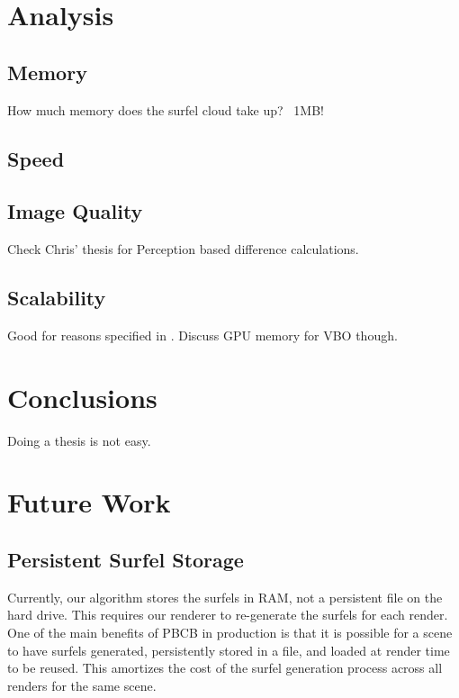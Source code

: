 \section{Analysis}

\subsection{Memory}
How much memory does the surfel cloud take up? ~1MB!

\subsection{Speed}

\subsection{Image Quality}
Check Chris' thesis for Perception based difference calculations.

\subsection{Scalability}
Good for reasons specified in \cite{bib:christensen2008}. Discuss GPU memory for VBO though.

\section{Conclusions}
Doing a thesis is not easy.

\section{Future Work}

\subsection{Persistent Surfel Storage}
Currently, our algorithm stores the surfels in RAM, not a persistent file on the hard drive. This requires our renderer to re-generate the surfels for each render. One of the main benefits of PBCB in production is that it is possible for a scene to have surfels generated, persistently stored in a file, and loaded at render time to be reused. This amortizes the cost of the surfel generation process across all renders for the same scene.

